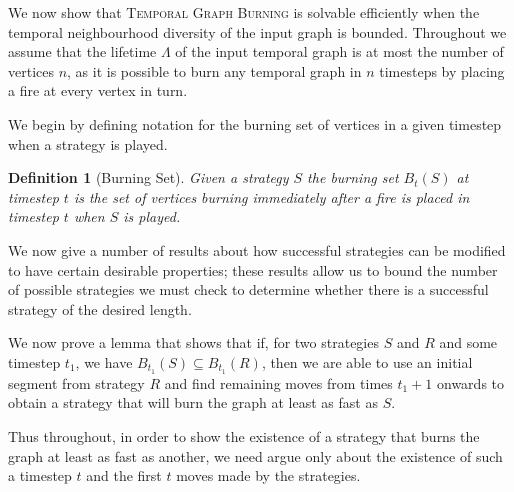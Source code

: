 \documentclass[preprint,12pt]{elsarticle}
\newtheorem{definition}{Definition}
\begin{document}
We now show that \textsc{Temporal Graph Burning} is solvable efficiently when the temporal neighbourhood diversity of the input graph is bounded. Throughout we assume that the lifetime $\Lambda$ of the input temporal graph is at most the number of vertices $n$, as it is possible to burn any temporal graph in $n$ timesteps by placing a fire at every vertex in turn.

We begin by defining notation for the burning set of vertices in a given timestep when a strategy is played.
\begin{definition}[Burning Set]
    Given a strategy $S$ the \emph{burning set} $B_{t}(S)$ at timestep $t$ is the set of vertices burning immediately after a fire is placed in timestep $t$ when $S$ is played.
\end{definition}

We now give a number of results about how successful strategies can be modified to have certain desirable properties; these results allow us to bound the number of possible strategies we must check to determine whether there is a successful strategy of the desired length.

We now prove a lemma that shows that if, for two strategies $S$ and $R$ and some timestep $t_1$, we have $B_{t_1}(S) \subseteq B_{t_1}(R)$, then we are able to use an initial segment from strategy $R$ and find remaining moves from times $t_1+1$ onwards to obtain a strategy that will burn the graph at least as fast as $S$.

Thus throughout, in order to show the existence of a strategy that burns the graph at least as fast as another, we need argue only about the existence of such a timestep $t$ and the first $t$ moves made by the strategies.
\end{document}
